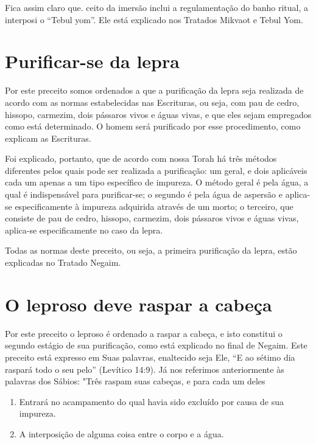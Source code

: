 Fica assim claro que. ceito da imersão inclui a
regulamenta­ção do banho ritual, a interposi o ``Tebul yom''. Ele está
explicado nos Tratados Mikvaot e Tebul Yom.

\section{Purificar-se da lepra}

Por este preceito somos ordenados a que a purificação da lepra seja
realizada de acordo com as normas estabelecidas nas Escrituras, ou seja,
com pau de cedro, hissopo, carmezim, dois pássaros vivos e águas vivas,
e que eles sejam empregados como está determinado. O homem será
purificado por esse procedimento, como explicam as Escrituras.

Foi explicado, portanto, que de acordo com nossa Torah há três mé­todos
diferentes pelos quais pode ser realizada a purificação: um geral, e
dois aplicáveis cada um apenas a um tipo específico de impureza. O
método geral é pela água, a qual é indispensável para purificar-se; o
segundo é pela água de aspersão e aplica-se especificamente à impureza
adquirida através de um mor­to; o terceiro, que consiste de pau de
cedro, hissopo, carmezim, dois pássaros vivos e águas vivas, aplica-se
especificamente no caso da lepra.

Todas as normas deste preceito, ou seja, a primeira purificação da
lepra, estão explicadas no Tratado Negaim.

\section{O leproso deve raspar a cabeça}

Por este preceito o leproso é ordenado a raspar a cabeça, e isto
cons­titui o segundo estágio de sua purificação, como está explicado no
final de Ne­gaim. Este preceito está expresso em Suas palavras,
enaltecido seja Ele, ``E ao sétimo dia raspará todo o seu pelo'' (Levítico
14:9). Já nos referimos anterior­mente às palavras dos Sábios: "Três
raspam suas cabeças, e para cada um deles


\begin{enumerate}
\def\labelenumi{\arabic{enumi}.}
\setcounter{enumi}{150}
\item
 
 Entrará no acampamento do qual havia sido excluído por causa de sua
 impureza.
 
\item
 
 A interposição de alguma coisa entre o corpo e a água.
 
\end{enumerate}


